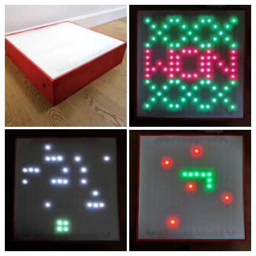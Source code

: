 \documentclass[a4paper,12pt]{article}
\begin{document}
 \vspace{1cm}
 { \centering
  \includegraphics[width = 0.4\textwidth]{box.jpg}
  \space{   }
  \includegraphics[width = 0.4\textwidth]{ttt.jpg}
  \\}
 \vspace{0.5cm}
 { \centering
 \includegraphics[width = 0.4\textwidth]{rd.jpg}
  \space{   }
  \includegraphics[width = 0.4\textwidth]{snake.jpg}
  \\}
  \vspace{1cm}
\end{document}
